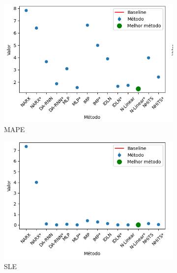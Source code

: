 \begin{figure}[htbp]
	\centering
	\begin{subfigure}[b]{0.3\textwidth}
		\centering
		\includegraphics[width=\textwidth]{figuras/mape_takens_brasil_results_test.png}
		\caption{\ac{MAPE}}
		\label{fig:mape_takens_brasil_results_test}
	\end{subfigure}
	\hfill
	\begin{subfigure}[b]{0.3\textwidth}
		\centering
		\includegraphics[width=\textwidth]{figuras/sle_takens_brasil_results_test.png}
		\caption{\ac{SLE}}
		\label{fig:sle_takens_brasil_results_test}
	\end{subfigure}
	\hfill
	\begin{subfigure}[b]{0.3\textwidth}
		\centering

\end{subfigure}
\end{figure}
